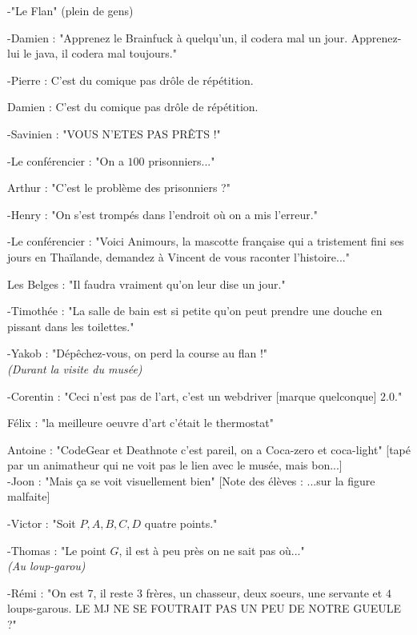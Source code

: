 \noindent -"Le Flan" (plein de gens)

\noindent -Damien : "Apprenez le Brainfuck à quelqu'un, il codera mal un jour. Apprenez-lui le java, il codera mal toujours."

\noindent -Pierre : C'est du comique pas drôle de répétition.

\noindent Damien : C'est du comique pas drôle de répétition.

\noindent -Savinien :  "VOUS N'ETES PAS PRÊTS !"

\noindent -Le conférencier : "On a $100$ prisonniers..."

\noindent Arthur : "C'est le problème des prisonniers ?"
 
\noindent -Henry : "On s'est trompés dans l'endroit où on a mis l'erreur."

\noindent -Le conférencier : "Voici Animours, la mascotte française qui a tristement fini ses jours en Thaïlande, demandez à Vincent de vous raconter l'histoire..."

\noindent Les Belges : "Il faudra vraiment qu'on leur dise un jour."

\noindent -Timothée : "La salle de bain est si petite qu'on peut prendre une douche en pissant dans les toilettes."

\noindent -Yakob : "Dépêchez-vous, on perd la course au flan !"
\\

\textit{(Durant la visite du musée)} 

\noindent -Corentin : "Ceci n'est pas de l'art, c'est un webdriver [marque quelconque] $2.0$."

\noindent Félix : "la meilleure oeuvre d'art c'était le thermostat"

\noindent Antoine : "CodeGear et Deathnote c'est pareil, on a Coca-zero et coca-light" [tapé par un animatheur qui ne voit pas le lien avec le musée, mais bon...]
\\

\noindent -Joon : "Mais ça se voit visuellement bien" [Note des élèves : ...sur la figure malfaite]

\noindent -Victor : "Soit $P,A,B,C,D$ quatre points."

\noindent -Thomas : "Le point $G$, il est à peu près on ne sait pas où..."
\\

\textit{(Au loup-garou)}

\noindent -Rémi : "On est $7$, il  reste $3$ frères, un chasseur, deux soeurs, une servante et $4$ loups-garous. LE MJ NE SE FOUTRAIT PAS UN PEU DE NOTRE GUEULE ?"

